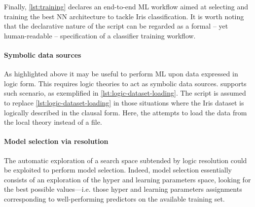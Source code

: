 \documentclass[
]{ceurart}
\begin{document}
Finally, \cref{lst:training} declares an end-to-end ML workflow aimed at selecting and training the best NN architecture to tackle Iris classification.
%
It is worth noting that the declarative nature of the script can be regarded as a formal -- yet human-readable -- specification of a classifier training workflow.

\paragraph{Symbolic data sources}

As highlighted above it may be useful to perform ML upon data expressed in logic form.
%
This requires logic theories to act as symbolic data sources.
%
\mllib{} supports such scenario, as exemplified in \cref{lst:logic-dataset-loading}.
%
The script is assumed to replace \cref{lst:logic-dataset-loading} in those situations where the Iris dataset is logically described in the clausal form.
%
Here, the  attempts to load the data from the local theory instead of a file.


\paragraph{Model selection via resolution}
\label{par:model-selection}

The automatic exploration of a search space subtended by logic resolution could be exploited to perform model selection.
%
Indeed, model selection essentially consists of an exploration of the hyper and learning parameters space, looking for the best possible values---i.e. those hyper and learning parameters assignments corresponding to well-performing predictors on the available training set.
\end{document}

